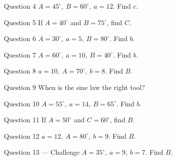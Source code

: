 \documentclass[11pt]{article}
\begin{document}
\begin{qbox}{Question 4}
$A=45^\circ,\ B=60^\circ,\ a=12$. Find $c$.\workspace{2.4cm}
\end{qbox}

\begin{qbox}{Question 5}
If $A=40^\circ$ and $B=75^\circ$, find $C$.\workspace{2.4cm}
\end{qbox}

\begin{qbox}{Question 6}
$A=30^\circ,\ a=5,\ B=80^\circ$. Find $b$.\workspace{2.4cm}
\end{qbox}

\begin{qbox}{Question 7}
$A=60^\circ,\ a=10,\ B=40^\circ$. Find $b$.\workspace{2.4cm}
\end{qbox}

\begin{qbox}{Question 8}
$a=10,\ A=70^\circ,\ b=8$. Find $B$.\workspace{2.4cm}
\end{qbox}

\begin{qbox}{Question 9}
When is the sine law the right tool?\workspace{2.4cm}
\end{qbox}

\begin{qbox}{Question 10}
$A=55^\circ,\ a=14,\ B=65^\circ$. Find $b$.\workspace{2.4cm}
\end{qbox}

\begin{qbox}{Question 11}
If $A=50^\circ$ and $C=60^\circ$, find $B$.\workspace{2.4cm}
\end{qbox}

\begin{qbox}{Question 12}
$a=12,\ A=80^\circ,\ b=9$. Find $B$.\workspace{2.4cm}
\end{qbox}

\begin{qbox}{Question 13 --- Challenge}
$A=35^\circ,\ a=9,\ b=7$. Find $B$.\workspace{3cm}
\end{qbox}

\clearpage
{}
\end{document}

